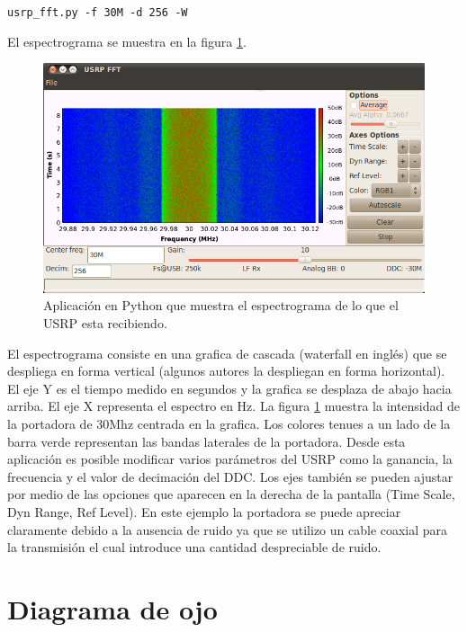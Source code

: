 \begin{center}
\verb|usrp_fft.py -f 30M -d 256 -W|
\end{center}

El espectrograma se muestra en la figura \ref{fig:spectrogramgui}.

\begin{figure}[htp]
  \centering
  \includegraphics[scale=0.7]{figs/spectrogramgui}
  \caption{Aplicaci\'on en Python que muestra el espectrograma de lo que el USRP esta recibiendo.}
  \label{fig:spectrogramgui}
\end{figure}

El espectrograma consiste en una grafica de cascada (waterfall en ingl\'es) que se despliega en
forma vertical (algunos autores la despliegan en forma horizontal). El eje Y es el tiempo medido en
segundos y la grafica se desplaza de abajo hacia arriba. El eje X representa el espectro en Hz. La
figura \ref{fig:spectrogramgui} muestra la intensidad de la portadora de 30Mhz centrada en la
grafica. Los colores tenues a un lado de la barra verde representan las bandas laterales de la
portadora. Desde esta aplicaci\'on es posible modificar varios par\'ametros del USRP como la
ganancia, la frecuencia y el valor de decimaci\'on del DDC. Los ejes tambi\'en se pueden ajustar por
medio de las opciones que aparecen en la derecha de la pantalla (Time Scale, Dyn Range, Ref Level).
En este ejemplo la portadora se puede apreciar claramente debido a la ausencia de ruido ya que se
utilizo un cable coaxial para la transmisi\'on el cual introduce una cantidad despreciable de ruido.
\section{Diagrama de ojo}


